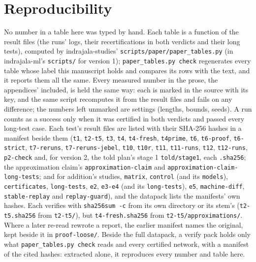 \documentclass[11pt]{article}
\begin{document}
\section{Reproducibility}
\label{sec:reproducibility}
No number in a table here was typed by hand. Each table is a function of the result files (the
runs' logs, their recertifications in both verdicts and their long tests), computed by
indrajala-studies' \texttt{scripts/paper/paper\_tables.py} (in indrajala-ml's \texttt{scripts/} for version 1); \texttt{paper\_tables.py check} regenerates every
table whose label this manuscript holds and compares its rows with the text, and it reports them all
the same. Every measured number in the prose, the appendices' included, is held the
same way: each is marked in the source with its key, and the same script recomputes it from the
result files and fails on any difference; the numbers left unmarked are settings (lengths, bounds,
seeds). A run counts as a success only when it was certified in both verdicts and passed every
long-test case. Each test's result files are listed with their SHA-256 hashes in a manifest
beside them (\texttt{t1}, \texttt{t2-t5}, \texttt{t3}, \texttt{t4}, \texttt{t4-fresh},
\texttt{t4prime}, \texttt{t6}, \texttt{t6-proof}, \texttt{t6-strict}, \texttt{t7-reruns}, \texttt{t7-reruns-jebel},
\texttt{t10}, \texttt{t10r}, \texttt{t11}, \texttt{t11-runs}, \texttt{t12}, \texttt{t12-runs},
\texttt{p2-check} and, for version 2, the told plan's stage 1 \texttt{told/stage1}, each
\texttt{.sha256}; the approximation claim's \texttt{approximation-claim} and \texttt{approximation-claim-long-tests};
and for addition's studies, \texttt{matrix}, \texttt{control} (and its \texttt{models}),
\texttt{certificates}, \texttt{long-tests}, \texttt{e2}, \texttt{e3-e4} (and its
\texttt{long-tests}), \texttt{e5}, \texttt{machine-diff}, \texttt{stable-replay} and
\texttt{replay-guard}), and the datapack lists the manifests' own hashes. Each verifies with
\texttt{sha256sum -c} from its own directory or its stem's (\texttt{t2-t5.sha256} from
\texttt{t2-t5/}), but \texttt{t4-fresh.sha256} from \texttt{t2-t5/approximations/}. Where a later
re-read rewrote a report, the earlier manifest names the original, kept beside it in
\texttt{proof-loose/}. Beside the full datapack, a verify pack holds only what
\texttt{paper\_tables.py check} reads and every certified network, with a manifest of the cited
hashes: extracted alone, it reproduces every number and table here.
\end{document}
